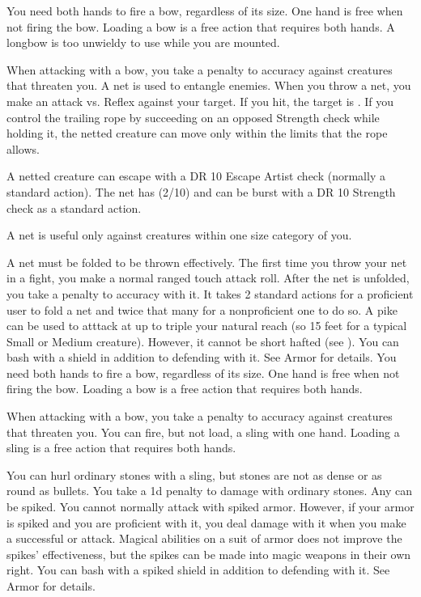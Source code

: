          You need both hands to fire a bow, regardless of its size. One hand is free when not firing the bow. Loading a bow is a free action that requires both hands. A longbow is too unwieldy to use while you are mounted.
        \par When attacking with a bow, you take a  penalty to accuracy against creatures that threaten you.
         A net is used to entangle enemies. When you throw a net, you make an attack vs. Reflex against your target. If you hit, the target is \slowed. If you control the trailing rope by succeeding on an opposed Strength check while holding it, the netted creature can move only within the limits that the rope allows.
        \par A netted creature can escape with a DR 10 Escape Artist check (normally a standard action). The net has (2/10) and can be burst with a DR 10 Strength check as a standard action.
        \par A net is useful only against creatures within one size category of you.
        \par A net must be folded to be thrown effectively. The first time you throw your net in a fight, you make a normal ranged touch attack roll. After the net is unfolded, you take a  penalty to accuracy with it. It takes 2 standard actions for a proficient user to fold a net and twice that many for a nonproficient one to do so.
         A pike can be used to atttack at up to triple your natural reach (so 15 feet for a typical Small or Medium creature).
        However, it cannot be short hafted (see ).
         You can bash with a shield in addition to defending with it. See Armor for details.
         You need both hands to fire a bow, regardless of its size. One hand is free when not firing the bow. Loading a bow is a free action that requires both hands.
        \par When attacking with a bow, you take a  penalty to accuracy against creatures that threaten you.
         You can fire, but not load, a sling with one hand. Loading a sling is a free action that requires both hands.
        \par You can hurl ordinary stones with a sling, but stones are not as dense or as round as bullets. You take a \minus1d penalty to damage with ordinary stones.
         Any  can be spiked.
        You cannot normally attack with spiked armor.
        However, if your armor is spiked and you are proficient with it, you deal damage with it when you make a successful  or  attack.
        Magical abilities on a suit of armor does not improve the spikes' effectiveness, but the spikes can be made into magic weapons in their own right.
         You can bash with a spiked shield in addition to defending with it. See Armor for details.

